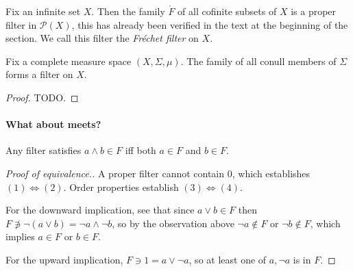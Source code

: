 \begin{example}
    Fix an infinite set \( X \). Then the family \( \acute F \) of all cofinite subsets of \( X \) is a proper filter in \( \mathcal{P}(X) \), this has already been verified in the text at the beginning of the section. We call this filter the \emph{Fréchet filter} on \( X \).
\end{example}

\begin{example}
    Fix a complete measure space \( (X, \Sigma, \mu) \). The family of all conull members of \( \Sigma \) forms a filter on \( X \).
\end{example}


\begin{proof}
TODO.
\end{proof}


\paragraph{What about meets?} Any filter satisfies \( a \wedge b \in F \) iff both \( a \in F \) and \( b \in F \).

\begin{proof}[Proof of equivalence.]
A proper filter cannot contain \( 0 \), which establishes \( (1) \Leftrightarrow (2) \). Order properties establish \( (3) \Leftrightarrow (4) \). 

For the downward implication, see that since \( a \vee b \in F \) then \( F \not\ni \neg(a \vee b) = \neg a \wedge \neg b \), so by the observation above \( \neg a \not\in F \) or \( \neg b \not\in F \), which implies \( a \in F \) or \( b \in F \).

For the upward implication, \( F \ni 1 = a \vee \neg a \), so at least one of \( a, \neg a \) is in \( F \).
\end{proof}

